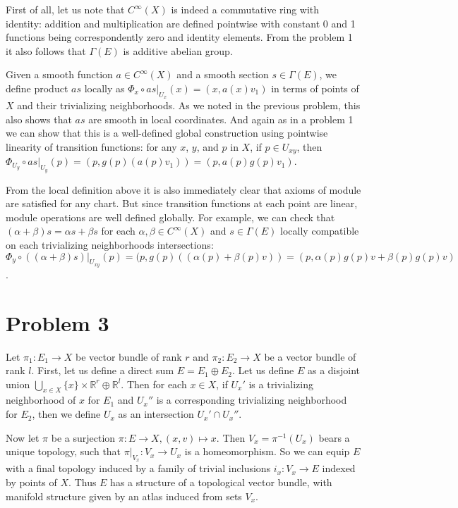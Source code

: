 \documentclass{article}[14pt]
\begin{document}
First of all, let us note that $C^\infty (X)$ is indeed a commutative ring with  \\ identity:
addition and multiplication are defined pointwise with constant 0 and 1 functions being correspondently
zero and identity elements. From the problem 1 it also follows that $\Gamma (E)$ is additive 
abelian group.

Given a smooth function $a \in C^\infty (X)$ and a smooth section $s \in \Gamma (E)$,
we define product $as$ locally as $\Phi_x \circ as |_{U_x} (x) = (x, a(x) v_1)$
in terms of points of $X$ and their trivializing neighborhoods.
As we noted in the previous problem, this also shows that $as$ are smooth in local coordinates.
And again as in a problem 1 we can show that this is a well-defined global construction using pointwise
linearity of transition functions: for any $x$, $y$, and $p$ in $X$, if $p \in U_{xy}$,
then $\Phi_{U_y} \circ as |_{U_y} (p) = (p, g(p)(a(p)v_1)) = (p, a(p)g(p)v_1)$.

From the local definition above it is also immediately clear that axioms of module are
satisfied for any chart. But since transition functions at each point are linear, module
operations are well defined globally. For example, we can check that $(\alpha + \beta)s = \alpha s + \beta s$
for each $\alpha, \beta \in C^\infty (X)$ and $s \in \Gamma (E)$ locally compatible on 
each trivializing neighborhoods intersections: 
$\Phi_y \circ ((\alpha + \beta) s) |_{U_{xy}} (p) = (p, g(p)((\alpha(p) + \beta(p) v)) = (p, \alpha(p)g(p)v + \beta(p)g(p)v)$.

\section{Problem 3}

Let $\pi_1: E_1 \rightarrow X$ be vector bundle of rank $r$ and 
$\pi_2: E_2 \rightarrow X$ be a vector bundle of rank $l$.
First, let us define a direct sum $E = E_1 \oplus E_2$.
Let us define $E$ as a disjoint union $\bigcup_{x \in X} \{ x \} \times \mathbb R^r \oplus \mathbb R^l$.
Then for each $x \in X$, if $U_x'$ is a trivializing neighborhood of $x$ for $E_1$
and $U_x''$ is a corresponding trivializing neighborhood for $E_2$,
then we define $U_x$ as an intersection $U_x' \cap U_x''$.

Now let $\pi$ be a surjection $\pi: E \rightarrow X, (x, v) \mapsto x$.
Then $V_x = \pi^{-1} (U_x)$ bears a unique topology, such that $\pi |_{V_x}: V_x \rightarrow U_x$
is a homeomorphism. So we can equip $E$ with a final topology induced by a family
of trivial inclusions $i_x: V_x \rightarrow E$ indexed by points of $X$. Thus $E$ has
a structure of a topological vector bundle, with manifold structure given by an atlas
induced from sets $V_x$.
\end{document}
